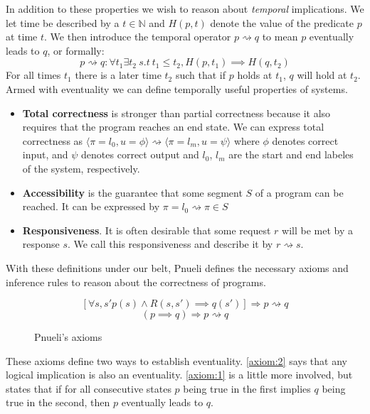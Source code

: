 \documentclass{uit-thesis}
\newcommand{\N}{\mathbb{N}}
\newcommand{\eventually}{\rightsquigarrow}
\begin{document}
In addition to these properties we wish to reason about \textit{temporal} implications. We let time be described by a $t \in \N$ and $H(p,t)$ denote the value of the predicate $p$ at time $t$.
We then introduce the temporal operator $p \eventually q$ to mean $p$ eventually leads to $q$, or formally:
$$p \eventually q: \forall t_1 \exists t_2\ s.t\ t_1 \le t_2,  H(p, t_1) \implies H(q, t_2)$$
For all times $t_1$ there is a later time $t_2$ such that if $p$ holds at $t_1$, $q$ will hold at $t_2$.
Armed with eventuality we can define temporally useful properties of systems.
\begin{itemize}[label={}]
    \item \textbf{Total correctness} is stronger than partial correctness because it also requires that the program reaches an end state. We can express total correctness as $\langle \pi = l_0, u = \phi\rangle \eventually \langle \pi = l_m, u = \psi\rangle$ where $\phi$ denotes correct input, and $\psi$ denotes correct output and $l_0$, $l_m$ are the start and end labeles of the system, respectively.
    \item \textbf{Accessibility} is the guarantee that some segment $S$ of a program can be reached. It can be expressed by $\pi = l_0 \eventually \pi \in S$
    \item \textbf{Responsiveness}. It is often desirable that some request $r$ will be met by a response $s$. We call this responsiveness and describe it by $r \eventually s$.
\end{itemize}

With these definitions under our belt, Pnueli defines the necessary axioms and inference rules to reason about the correctness of programs.

\begin{figure}[h!]
    \begin{equation}\tag{A1}\label{axiom:1}
        [\forall s, s' p(s) \land R(s,s') \implies q(s')] \Rightarrow p \eventually q
    \end{equation}
    \begin{equation}\tag{A2}\label{axiom:2}
        (p \implies q) \Rightarrow p \eventually q
    \end{equation}
\caption{Pnueli's axioms}
\end{figure}

These axioms define two ways to establish eventuality. \ref{axiom:2} says that any logical implication is also an eventuality. \ref{axiom:1} is a little more involved, but states that if for all consecutive states $p$ being true in the first implies $q$ being true in the second, then $p$ eventually leads to $q$.
\end{document}
